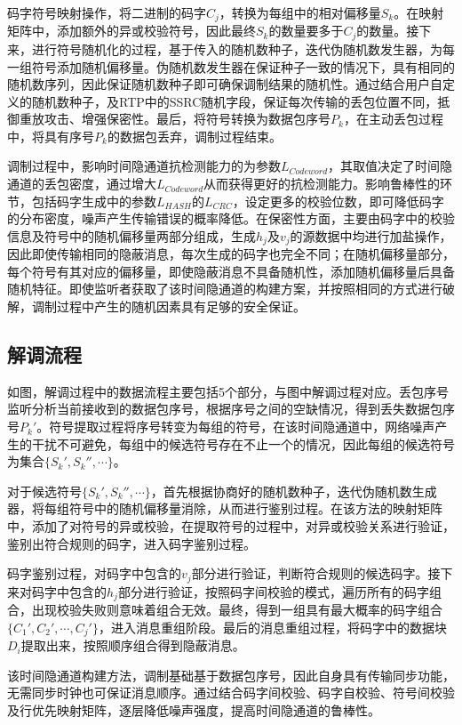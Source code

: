 码字符号映射操作，将二进制的码字$C_{j}$，转换为每组中的相对偏移量$S_{k}$。在映射矩阵中，添加额外的异或校验符号，因此最终$S_{k}$的数量要多于$C_{j}$的数量。接下来，进行符号随机化的过程，基于传入的随机数种子，迭代伪随机数发生器，为每一组符号添加随机偏移量。伪随机数发生器在保证种子一致的情况下，具有相同的随机数序列，因此保证随机数种子即可确保调制结果的随机性。通过结合用户自定义的随机数种子，及RTP中的SSRC随机字段，保证每次传输的丢包位置不同，抵御重放攻击、增强保密性。最后，将符号转换为数据包序号$P_{k}$，在主动丢包过程中，将具有序号$P_{k}$的数据包丢弃，调制过程结束。

调制过程中，影响时间隐通道抗检测能力的为参数$L_{Codeword}$，其取值决定了时间隐通道的丢包密度，通过增大$L_{Codeword}$从而获得更好的抗检测能力。影响鲁棒性的环节，包括码字生成中的参数$L_{HASH}$的$L_{CRC}$，设定更多的校验位数，即可降低码字的分布密度，噪声产生传输错误的概率降低。在保密性方面，主要由码字中的校验信息及符号中的随机偏移量两部分组成，生成$h_{j}$及$v_{j}$的源数据中均进行加盐操作，因此即使传输相同的隐蔽消息，每次生成的码字也完全不同；在随机偏移量部分，每个符号有其对应的偏移量，即使隐蔽消息不具备随机性，添加随机偏移量后具备随机特征。即使监听者获取了该时间隐通道的构建方案，并按照相同的方式进行破解，调制过程中产生的随机因素具有足够的安全保证。

\subsection{解调流程}
\label{chap:hash:designation:demodulation}

如图，解调过程中的数据流程主要包括5个部分，与图中解调过程对应。丢包序号监听分析当前接收到的数据包序号，根据序号之间的空缺情况，得到丢失数据包序号$P_{k}'$。符号提取过程将序号转变为每组的符号，在该时间隐通道中，网络噪声产生的干扰不可避免，每组中的候选符号存在不止一个的情况，因此每组的候选符号为集合$\{S_{k}',S_{k}'',\cdots \}$。

对于候选符号$\{S_{k}',S_{k}'',\cdots \}$，首先根据协商好的随机数种子，迭代伪随机数生成器，将每组符号中的随机偏移量消除，从而进行鉴别过程。在该方法的映射矩阵中，添加了对符号的异或校验，在提取符号的过程中，对异或校验关系进行验证，鉴别出符合规则的码字，进入码字鉴别过程。

码字鉴别过程，对码字中包含的$v_{j}$部分进行验证，判断符合规则的候选码字。接下来对码字中包含的$h_{j}$部分进行验证，按照码字间校验的模式，遍历所有的码字组合，出现校验失败则意味着组合无效。最终，得到一组具有最大概率的码字组合$\{C_{1}',C_{2}',\cdots, C_{j}'\}$，进入消息重组阶段。最后的消息重组过程，将码字中的数据块$D_{i}$提取出来，按照顺序组合得到隐蔽消息。

该时间隐通道构建方法，调制基础基于数据包序号，因此自身具有传输同步功能，无需同步时钟也可保证消息顺序。通过结合码字间校验、码字自校验、符号间校验及行优先映射矩阵，逐层降低噪声强度，提高时间隐通道的鲁棒性。